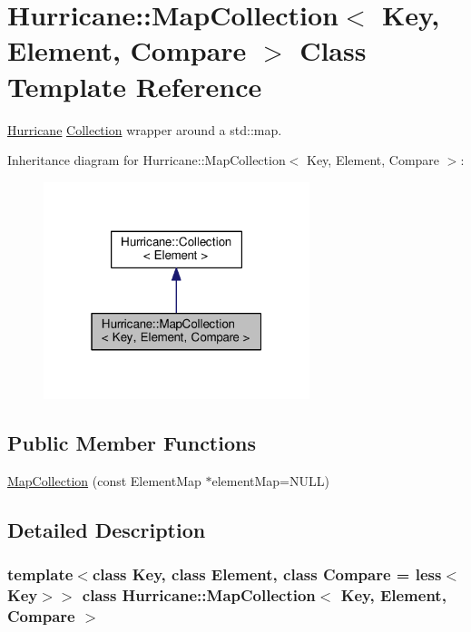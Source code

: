 \hypertarget{classHurricane_1_1MapCollection}{}\section{Hurricane\+:\+:Map\+Collection$<$ Key, Element, Compare $>$ Class Template Reference}
\label{classHurricane_1_1MapCollection}


\mbox{\hyperlink{namespaceHurricane}{Hurricane}} \mbox{\hyperlink{classHurricane_1_1Collection}{Collection}} wrapper around a std\+::map.  




Inheritance diagram for Hurricane\+:\+:Map\+Collection$<$ Key, Element, Compare $>$\+:\nopagebreak
\begin{figure}[H]
\begin{center}
\leavevmode
\includegraphics[width=220pt]{classHurricane_1_1MapCollection__inherit__graph}
\end{center}
\end{figure}
\subsection*{Public Member Functions}
\begin{DoxyCompactItemize}
\item 
\mbox{\hyperlink{classHurricane_1_1MapCollection_a0b905fb46ced35815132e5eab62a8de1}{Map\+Collection}} (const Element\+Map $\ast$element\+Map=N\+U\+LL)
\end{DoxyCompactItemize}


\subsection{Detailed Description}
\subsubsection*{template$<$class Key, class Element, class Compare = less$<$\+Key$>$$>$\newline
class Hurricane\+::\+Map\+Collection$<$ Key, Element, Compare $>$}

